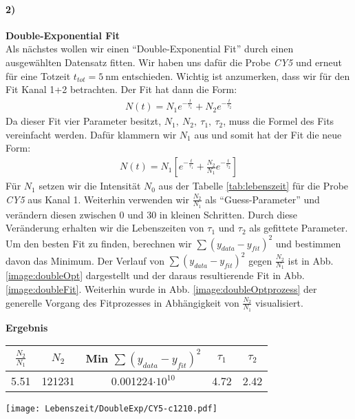 \paragraph{2)}\textbf{Double-Exponential Fit}\\
Als nächstes wollen wir einen \enquote{Double-Exponential Fit} durch einen ausgewählten Datensatz fitten. Wir haben uns dafür die Probe \textit{CY5} und erneut für eine Totzeit $t_{tot}=\SI{5}{\nano\metre}$ entschieden. Wichtig ist anzumerken, dass wir für den Fit Kanal 1+2 betrachten. Der Fit hat dann die Form:
\begin{gather}
    N(t) = N_1e^{-\frac{t}{\tau_1}} + N_2e^{-\frac{t}{\tau_2}}
\end{gather}
Da dieser Fit vier Parameter besitzt, $N_1,~N_2,~\tau_1,~\tau_2$, muss die Formel des Fits vereinfacht werden. Dafür klammern wir $N_1$ aus und somit hat der Fit die neue Form:
\begin{gather}
    N(t) = N_1\left[e^{-\frac{t}{\tau_1}} + \frac{N_2}{N_1}e^{-\frac{t}{\tau_2}}\right]
\end{gather}
Für $N_1$ setzen wir die Intensität $N_0$ aus der Tabelle \ref{tab:lebenszeit} für die Probe \textit{CY5} aus Kanal 1. Weiterhin verwenden wir $\frac{N_2}{N_1}$ als \enquote{Guess-Parameter} und verändern diesen zwischen 0 und 30 in kleinen Schritten. Durch diese Veränderung erhalten wir die Lebenszeiten von $\tau_1$ und $\tau_2$ als gefittete Parameter. Um den besten Fit zu finden, berechnen wir $\sum(y_{data}-y_{fit})^2$ und bestimmen davon das Minimum. Der Verlauf von $\sum(y_{data}-y_{fit})^2$ gegen $\frac{N_2}{N_1}$ ist in Abb. \ref{image:doubleOpt} dargestellt und der daraus resultierende Fit in Abb. \ref{image:doubleFit}. Weiterhin wurde in Abb. \ref{image:doubleOptprozess} der generelle Vorgang des Fitprozesses in Abhängigkeit von $\frac{N_2}{N_1}$ visualisiert.
\begin{center}
    \textbf{Ergebnis}\\[0,2cm]
    \begin{tabular}{c c | c c c}
        $\frac{N_2}{N_1}$ & $N_2$ & Min $\sum(y_{data}-y_{fit})^2$ & $\tau_1$ & $\tau_2$ \\
        \hline
        5.51 & 121231 & 0.001224$\cdot10^{10}$ & 4.72 & 2.42 \\
    \end{tabular}
\end{center}
\begin{center}
    \texttt{[image: Lebenszeit/DoubleExp/CY5-c1210.pdf]}
    \label{image:doubleFit}
\end{center}

